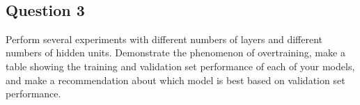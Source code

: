 \documentclass[11pt]{article}
\begin{document}
    \begin{center}
    \end{center}
    { \hspace*{\fill} \\}
    
    \hypertarget{question-3}{%
\subsection{Question 3}\label{question-3}}

Perform several experiments with different numbers of layers and
different numbers of hidden units. Demonstrate the phenomenon of
overtraining, make a table showing the training and validation set
performance of each of your models, and make a recommendation about
which model is best based on validation set performance.
\end{document}
